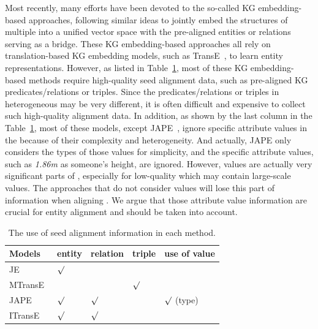 	Most recently, many efforts have been devoted to the so-called KG embedding-based approaches, following similar ideas to jointly embed
the structures of multiple \KGs into a unified vector space with the pre-aligned entities or relations serving as a bridge. These
KG embedding-based approaches all rely on translation-based KG embedding models, such as TransE~\cite{bordes2013translating}, to learn
entity representations. However, as listed in Table~\ref{seed}, most of these KG embedding-based methods require high-quality seed
alignment data, such as pre-aligned KG predicates/relations or triples. Since the predicates/relations or triples in heterogeneous \KGs may
be very different, it is often difficult and expensive to collect such high-quality alignment data. In addition, as shown by the last
column in the Table~\ref{seed}, most of these models, except JAPE~\cite{sun2017cross}, ignore specific attribute values in the \KGs because
of their complexity and heterogeneity. And actually, JAPE only considers the types of those values for simplicity, and the specific
attribute values, such as \textit{1.86m} as someone's height, are ignored. However, values are actually very significant parts of \KGs, especially for low-quality \KGs which may contain large-scale values. The approaches that do not consider values will lose this part of information when aligning \KGs. We argue that those attribute value information are crucial for entity alignment and should be taken into account.

\begin{table}
	\centering
	\scriptsize
	\begin{tabular}{l|llll}
		\toprule
		\bf Models & \bf entity & \bf relation & \bf triple & \bf use of value \\
		\midrule
		JE~\cite{hao2016joint} & ${\surd}$ & & & \\
		MTransE~\cite{chen2016multilingual} & $ $ & $ $ & ${\surd}$ & \\
		JAPE~\cite{sun2017cross} & ${\surd}$& ${\surd}$& & ${\surd}$ (type)\\
		ITransE~\cite{zhu2017iterative} & ${\surd}$ & ${\surd}$& & \\
		\bottomrule
	\end{tabular}
	\caption{The use of seed alignment information in each method.}
	\label{seed}
\end{table}
	
